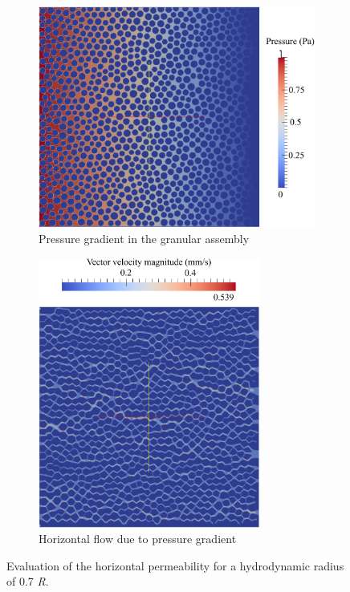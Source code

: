  
\begin{figure}[tbhp]
	\centering
	\begin{subfigure}[b]{0.475\textwidth}
		\centering
		\includegraphics[width=\textwidth]{Pressure}
		\caption{Pressure gradient in the granular assembly}
		\label{fig:pressure}
	\end{subfigure}
	\begin{subfigure}[b]{0.475\textwidth}
		\centering
		\includegraphics[width=0.8\textwidth]{Velocity}
		\caption{Horizontal flow due to pressure gradient}
		\label{fig:velocity}
	\end{subfigure}
	\caption{Evaluation of the horizontal permeability for a 
	hydrodynamic radius of 0.7 \textit{R}.}
	\label{fig:perm}
\end{figure}


